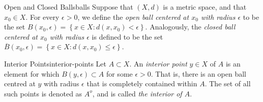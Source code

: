 \documentclass{article}
\numberwithin{equation}{section}
\numberwithin{figure}{section}
\begin{document}
\begin{definition}{Open and Closed Balls}{balls}
    Suppose that $ (X, d) $ is a metric space, and that $ x_0 \in X $. For every
    $ \epsilon > 0 $, we define the \emph{open ball centered at $ x_0 $ with
    radius $ \epsilon $} to be the set $ B(x_0, \epsilon) = \left\{ x \in X
    \colon d(x, x_0) < \epsilon \right\} $. Analogously, the \emph{closed ball
    centered at $ x_0 $ with radius $ \epsilon $} is defined to be the set
    $ \overline{B}(x_0, \epsilon) = \left\{ x \in X \colon d(x, x_0) \leq
    \epsilon \right\} $.

    \centering
    \begin{minipage}{.5\linewidth}
        \centering
    \end{minipage}\hfill
    \begin{minipage}{.5\linewidth}
        \centering
    \end{minipage}
\end{definition}
\begin{definition}{Interior Points}{interior-points}
    Let $ A \subset X $. An \emph{interior point} $ y \in X $ of $ A $ is an
    element for which $ B(y, \epsilon) \subset A $ for some $ \epsilon > 0 $.
    That is, there is an open ball centred at $ y $ with radius $ \epsilon $
    that is completely contained within $ A $. The set of all such points is
    denoted as $ A^o $, and is called \emph{the interior of $ A $}.
\end{definition}
\end{document}
